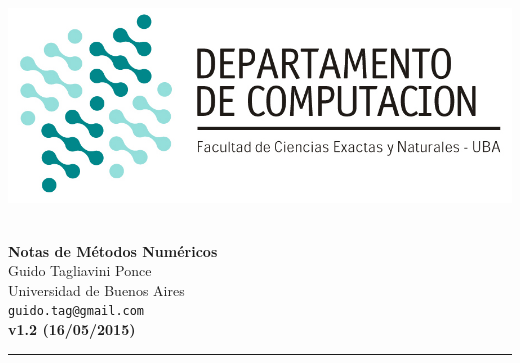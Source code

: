 \hfill \includegraphics[scale = 0.75]{imagenes/logo_dc.jpg}~\\[0.25cm]

\begin{center}
	\textbf{\Large Notas de Métodos Numéricos}\\[1cm]
	{\large Guido Tagliavini Ponce\\[0.15cm]}
	Universidad de Buenos Aires\\[0.15cm]
	\texttt{guido.tag@gmail.com}\\[1cm]
	\textbf{v1.2 (16/05/2015)}\\[1cm]
\end{center}
\rule{\linewidth}{0.2mm}
